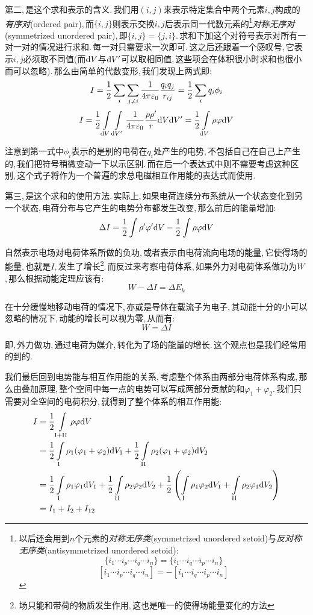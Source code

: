 第二,\,是这个求和表示的含义.\,我们用$(i,j)$来表示特定集合中两个元素$i,j$构成的\emph{有序对}(ordered pair),\,而$\{i,j\}$则表示交换$i,j$后表示同一代数元素的\footnote{以后还会用到$n$个元素的\emph{对称无序类}(symmetrized unordered setoid)与\emph{反对称无序类}(antisymmetrized unordered setoid):
\[\{i_1\cdots i_p\cdots i_q\cdots i_n\}=\{i_1\cdots i_q\cdots i_p\cdots i_n\}\]
\[[i_1\cdots i_p\cdots i_q\cdots i_n]=-[i_1\cdots i_q\cdots i_p\cdots i_n]\]
}\emph{对称无序对}(symmetrized unordered pair),\,即$\{i,j\}=\{j,i\}$.\,求和下加这个对符号表示对所有一对一对的情况进行求和.\,每一对只需要求一次即可.\,这之后还跟着一个感叹号,\,它表示$i,j$必须取不同值(而$\textrm{d} V$与$\textrm{d} V'$可以取相同值,\,这些项会在体积很小时求和也很小而可以忽略).\,那么由简单的代数变形,\,我们发现上两式即:
\[I=\frac{1}{2}\sum_i\sum_{j\neq i}\frac{1}{4\pi\varepsilon_0}\frac{q_iq_j}{r_{ij}}=\frac{1}{2}\sum_iq_i\phi_i\]
\[I=\frac{1}{2}\int\limits_{\textrm{d} V}\int\limits_{\textrm{d} V'}\frac{1}{4\pi\varepsilon_0}\frac{\rho\rho'}{r}\textrm{d} V\textrm{d} V'=\frac{1}{2}\int\limits_{\textrm{d} V}\rho \varphi \textrm{d} V\]

注意到第一式中$\phi_i$表示的是别的电荷在$q_i$处产生的电势,\,不包括自己在自己上产生的,\,我们把符号稍微变动一下以示区别.\,而在后一个表达式中则不需要考虑这种区别,\,这个式子将作为一个普遍的求总电磁相互作用能的表达式而使用.

第三,\,是这个求和的使用方法.\,实际上,\,如果电荷连续分布系统从一个状态变化到另一个状态,\,电荷分布与它产生的电势分布都发生改变,\,那么前后的能量增加:
\[\Delta I=\frac{1}{2}\int\rho' \varphi' \textrm{d} V-\frac{1}{2}\int\rho \varphi \textrm{d} V\]

自然表示电场对电荷体系所做的负功,\,或者表示由电荷流向电场的能量,\,它使得场的能量,\,也就是$I$,\,发生了增长\footnote{场只能和带荷的物质发生作用,\,这也是唯一的使得场能量变化的方法}.\,而反过来考察电荷体系,\,如果外力对电荷体系做功为$W$,\,那么根据动能定理应该有:
\[W-\Delta I=\Delta E_k\]

在十分缓慢地移动电荷的情况下,\,亦或是导体在载流子为电子,\,其动能十分的小可以忽略的情况下,\,动能的增长可以视为零,\,从而有:
\[W=\Delta I\]

即,\,外力做功,\,通过电荷为媒介,\,转化为了场的能量的增长.\,这个观点也是我们经常用的到的.

我们最后回到电势能与相互作用能的关系,\,考虑整个体系由两部分电荷体系构成,\,那么由叠加原理,\,整个空间中每一点的电势可以写成两部分贡献的和$\varphi_1+\varphi_2$.\,我们只需要对全空间的电荷积分,\,就得到了整个体系的相互作用能:
\begin{align*}
I 	&=\frac{1}{2}\int\limits_{\rm I+II}\rho \varphi \textrm{d} V \\
	&=\frac{1}{2}\int\limits_{\rm I}\rho_1 (\varphi_1+\varphi_2)\textrm{d} V_1 + \frac{1}{2}\int\limits_{\rm II}\rho_2 (\varphi_1+\varphi_2)\textrm{d} V_2 \\
	&=\frac{1}{2}\int\limits_{\rm I}\rho_1 \varphi_1\textrm{d} V_1+\frac{1}{2}\int\limits_{\rm II}\rho_2 \varphi_2\textrm{d} V_2+\frac{1}{2}\left(\int\limits_{\rm I}\rho_1 \varphi_2\textrm{d} V_1+\int\limits_{\rm II}\rho_2 \varphi_1\textrm{d} V_2\right) \\
	&=I_1+I_2+I_{12}
\end{align*}

